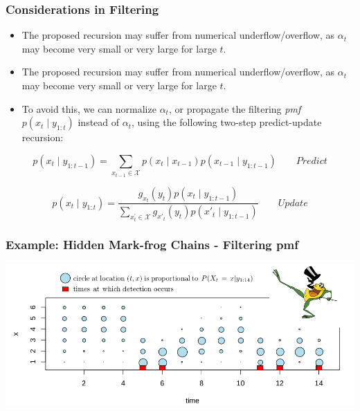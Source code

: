 \documentclass[xcolor=dvipsnames, compress]{beamer}
\begin{document}
%
\begin{frame}
\frametitle{Considerations in Filtering}
\begin{itemize}
\item 	The proposed recursion may suffer from numerical underflow/overflow,
as $\alpha_{t}$ may become very small or very large for large $t$. 
\item  The proposed recursion may suffer from numerical underflow/overflow,
as $\alpha_{t}$ may become very small or very large for large $t$. 
\item To avoid this, we can normalize $\alpha_{t}$, or propagate the filtering
\emph{pmf $p\left(x_{t}\mid y_{1:t}\right)$ }instead of $\alpha_{t}$,
using the following two-step predict-update recursion:
\end{itemize}
$$
p\left(x_{t}\mid y_{1:t-1}\right)=\sum_{x_{t-1}\in\mathcal{{X}}}p\left(x_{t}\mid x_{t-1}\right)p\left(x_{t-1}\mid y_{1:t-1}\right)\qquad Predict
$$

$$
p\left(x_{t}\mid y_{1:t}\right)=\frac{g_{x_{t}}\left(y_{t}\right)p\left(x_{t}\mid y_{1:t-1}\right)}{\sum_{x_{t}^{'}\in\mathcal{{X}}}g_{x'_{t}}\left(y_{t}\right)p\left(x'_{t}\mid y_{1:t-1}\right)}\qquad Update
$$
\end{frame}

\begin{frame}
\frametitle{Example: Hidden Mark-frog Chains - Filtering pmf}
\begin{center}
	\includegraphics[width=1.01\textwidth]{images/frog_filtering.png}
\end{center}
\end{frame}
\end{document}
